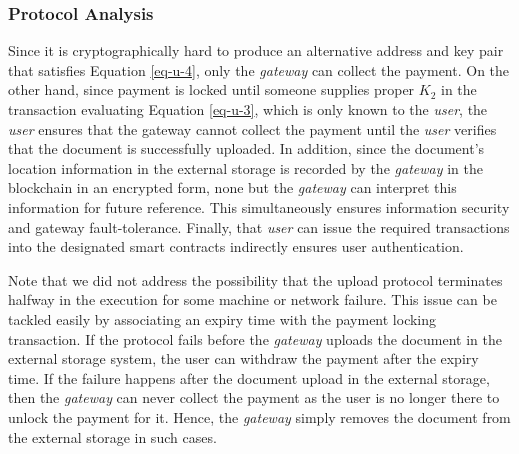 \subsubsection*{Protocol Analysis}
Since it is cryptographically hard to produce an alternative address and key pair that satisfies Equation \ref{eq-u-4}, only the {\it gateway} can collect the payment. On the other hand, since payment is locked until someone supplies proper $K_2$ in the transaction evaluating Equation \ref{eq-u-3}, which is only known to the {\it user}, the {\it user} ensures that the gateway cannot collect the payment until the {\it user} verifies that the document is successfully uploaded. In addition, since the document's location information in the external storage is recorded by the {\it gateway} in the blockchain in an encrypted form, none but the {\it gateway} can interpret this information for future reference. This simultaneously ensures information security and gateway fault-tolerance. Finally, that \textit{user} can issue the required transactions into the designated smart contracts indirectly ensures user authentication.

Note that we did not address the possibility that the upload protocol terminates halfway in the execution for some machine or network failure. This issue can be tackled easily by associating an expiry time with the payment locking transaction. If the protocol fails before the {\it gateway} uploads the document in the external storage system, the user can withdraw the payment after the expiry time. If the failure happens after the document upload in the external storage, then the {\it gateway} can never collect the payment as the user is no longer there to unlock the payment for it. Hence, the {\it gateway} simply removes the document from the external storage in such cases.      

